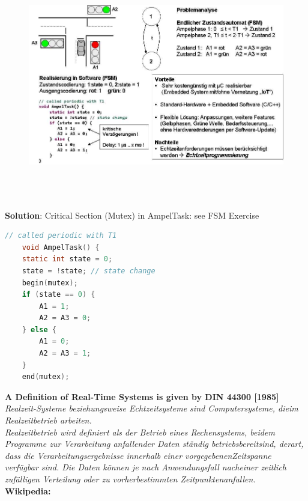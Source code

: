 \begin{figure}[h]
    \centering
    \includegraphics[width=15cm, height=10cm]{Images/image13.png}
    \label{fig:Fig 5}
\end{figure}
\newpage
\textbf{Solution}: Critical Section (Mutex) in AmpelTask:  see FSM Exercise\\

\begin{lstlisting}[style=mystyle, language=c]
 	// called periodic with T1  
	void AmpelTask() {
	static int state = 0;
	state = !state; // state change
  	begin(mutex);
	if (state == 0) {
		A1 = 1;
		A2 = A3 = 0;
	} else {
		A1 = 0;
		A2 = A3 = 1;
	}
  	end(mutex);
\end{lstlisting}

{\rot\bf A Definition of Real-Time Systems is given by DIN 44300 [1985]}\\

\textit{ Realzeit-Systeme beziehungsweise Echtzeitsysteme sind Computersysteme, dieim Realzeitbetrieb arbeiten.}\\

\textit{Realzeitbetrieb wird definiert als der Betrieb eines Rechensystems, beidem Programme zur Verarbeitung anfallender Daten st\"{a}ndig betriebsbereitsind, derart, dass die Verarbeitungsergebnisse innerhalb einer vorgegebenenZeitspanne verf\"{u}gbar sind. Die Daten k\"{o}nnen je nach Anwendungsfall nacheiner zeitlich zuf\"{a}lligen Verteilung oder zu vorherbestimmten Zeitpunktenanfallen.}\\

{\rot\bf Wikipedia:}\\

